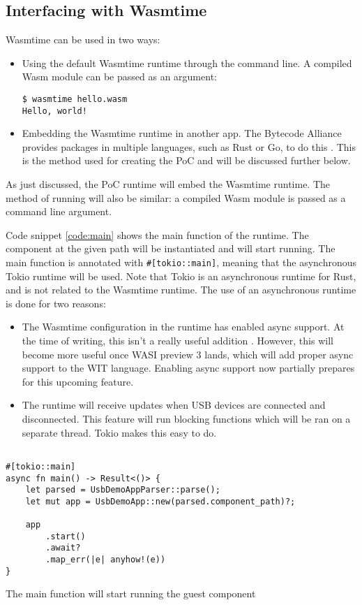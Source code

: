 \subsection{Interfacing with Wasmtime}
Wasmtime can be used in two ways: 
\begin{itemize}
\item Using the default Wasmtime runtime through the command line. A compiled \acrshort{Wasm} module can be passed as an argument:
\begin{verbatim}
$ wasmtime hello.wasm
Hello, world!
\end{verbatim}
\item Embedding the Wasmtime runtime in another app. The Bytecode Alliance provides packages in multiple languages, such as Rust or Go, to do this \cite{wasmtime_website}. This is the method used for creating the \acrshort{PoC} and will be discussed further below.
\end{itemize}

As just discussed, the \acrshort{PoC} runtime will embed the Wasmtime runtime. The method of running will also be similar: a compiled \acrshort{Wasm} module is passed as a command line argument.

Code snippet \ref{code:main} shows the main function of the runtime. The component at the given path will be instantiated and will start running. The main function is annotated with \texttt{\#[tokio::main]}, meaning that the asynchronous Tokio runtime \cite{tokio} will be used. Note that Tokio is an asynchronous runtime for Rust, and is not related to the Wasmtime runtime. The use of an asynchronous runtime is done for two reasons:
\begin{itemize}
\item The Wasmtime configuration in the runtime has enabled async support. At the time of writing, this isn't a really useful addition \cite{wasmtime_async_config}. However, this will become more useful once \acrshort{WASI} preview 3 lands, which will add proper async support to the \acrshort{WIT} language. Enabling async support now partially prepares for this upcoming feature.

\item The runtime will receive updates when USB devices are connected and disconnected. This feature will run blocking functions which will be ran on a separate thread. Tokio makes this easy to do.
\end{itemize}


\begin{code}
\begin{verbatim}

#[tokio::main]
async fn main() -> Result<()> {
	let parsed = UsbDemoAppParser::parse();
	let mut app = UsbDemoApp::new(parsed.component_path)?;

	app
		.start()
		.await?
		.map_err(|e| anyhow!(e))
}
\end{verbatim}
\caption{The main function will start running the guest component}
\label{code:main}
\end{code}


